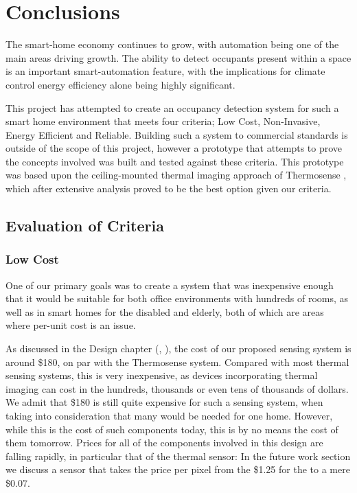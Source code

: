 \documentclass[../thesis/thesis.tex]{subfiles}
\begin{document}
 \chapter{Conclusions}

The smart-home economy continues to grow, with automation being one of the main areas driving growth. The ability to detect occupants present within a space is an important smart-automation feature, with the implications for climate control energy efficiency alone being highly significant.

This project has attempted to create an occupancy detection system for such a smart home environment that meets four criteria; Low Cost, Non-Invasive, Energy Efficient and Reliable. Building such a system to commercial standards is outside of the scope of this project, however a prototype that attempts to prove the concepts involved was built and tested against these criteria. This prototype was based upon the ceiling-mounted thermal imaging approach of Thermosense \cite{beltran2013thermosense}, which after extensive analysis proved to be the best option given our criteria.

\section{Evaluation of Criteria}

\subsection{Low Cost}
One of our primary goals was to create a system that was inexpensive enough that it would be suitable for both office environments with hundreds of rooms, as well as in smart homes for the disabled and elderly, both of which are areas where per-unit cost is an issue.

As discussed in the Design chapter (, ), the cost of our proposed sensing system is around \$180, on par with the Thermosense system. Compared with most thermal sensing systems, this is very inexpensive, as devices incorporating thermal imaging can cost in the hundreds, thousands or even tens of thousands of dollars. We admit that \$180 is still quite expensive for such a sensing system, when taking into consideration that many would be needed for one home. However, while this is the cost of such components today, this is by no means the cost of them tomorrow. Prices for all of the components involved in this design are falling rapidly, in particular that of the thermal sensor: In the future work section we discuss a sensor that takes the price per pixel from the \$1.25 for the \mlx to a mere \$0.07.
\end{document}

